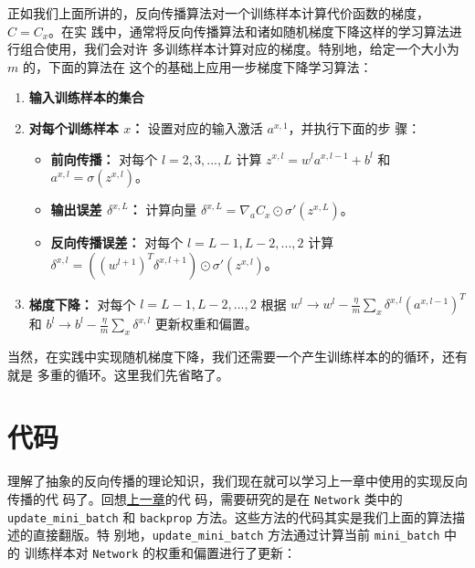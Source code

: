 正如我们上面所讲的，反向传播算法对一个训练样本计算代价函数的梯度，$C=C_x$。在实
践中，通常将反向传播算法和诸如随机梯度下降这样的学习算法进行组合使用，我们会对许
多训练样本计算对应的梯度。特别地，给定一个大小为 $m$ 的\minibatch{}，下面的算法在
这个\minibatch{}的基础上应用一步梯度下降学习算法：

\begin{enumerate}
\item \textbf{输入训练样本的集合}
\item \textbf{对每个训练样本 $x$：} 设置对应的输入激活 $a^{x,1}$，并执行下面的步
  骤：
  \begin{itemize}
  \item \textbf{前向传播：} 对每个 $l=2,3,...,L$ 计算 $z^{x,l} = w^la^{x,l-1} +
    b^l$ 和 $a^{x,l} = \sigma(z^{x,l})$。
  \item \textbf{输出误差 $\delta^{x,L}$：} 计算向量
    $\delta^{x,L} = \nabla_a C_x \odot \sigma'(z^{x,L})$。
  \item \textbf{反向传播误差：} 对每个 $l=L-1, L-2, ..., 2$ 计算
    $\delta^{x,l} = ((w^{l+1})^T\delta^{x,l+1})\odot \sigma'(z^{x,l})$。
  \end{itemize}
\item \textbf{梯度下降：} 对每个 $l=L-1, L-2, ..., 2$ 根据
  $w^l \rightarrow w^l - \frac{\eta}{m}\sum_x \delta^{x,l}(a^{x,l-1})^T$ 和
  $b^l \rightarrow b^l - \frac{\eta}{m}\sum_x \delta^{x,l}$ 更新权重和偏置。
\end{enumerate}

当然，在实践中实现随机梯度下降，我们还需要一个产生训练样本的\minibatch{}的循环，还有就是
多重\epochs{}的循环。这里我们先省略了。

\section{代码}
\label{sec:the_code_for_backpropagation}

理解了抽象的反向传播的理论知识，我们现在就可以学习上一章中使用的实现反向传播的代
码了。回想\hyperref[sec:implementing_our_network_to_classify_digits]{上一章}的代
码，需要研究的是在 \lstinline!Network! 类中的 \lstinline!update_mini_batch! 和
\lstinline!backprop! 方法。这些方法的代码其实是我们上面的算法描述的直接翻版。特
别地，\lstinline!update_mini_batch! 方法通过计算当前 \lstinline!mini_batch! 中的
训练样本对 \lstinline!Network! 的权重和偏置进行了更新：

